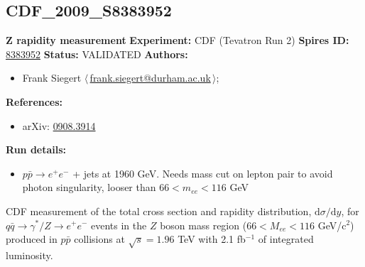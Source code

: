 \subsection[CDF\_2009\_S8383952]{CDF\_2009\_S8383952\,\cite{Aaltonen:2009pc}}
\textbf{Z rapidity measurement}\newline
\textbf{Experiment:} CDF (Tevatron Run 2) \newline
\textbf{Spires ID:} \href{http://www.slac.stanford.edu/spires/find/hep/www?rawcmd=key+8383952}{8383952}\newline
\textbf{Status:} VALIDATED\newline
\textbf{Authors:}
\begin{itemize}
  \item Frank Siegert $\langle\,$\href{mailto:frank.siegert@durham.ac.uk}{frank.siegert@durham.ac.uk}$\,\rangle$;
\end{itemize}
\textbf{References:}
\begin{itemize}
  \item arXiv: \href{http://arxiv.org/abs/0908.3914}{0908.3914}
\end{itemize}
\textbf{Run details:}
\begin{itemize}

  \item $p \bar{p} \to e^+ e^-$ + jets at 1960 GeV. Needs mass cut on lepton pair to  avoid photon singularity, looser than $66 < m_{ee} < 116$ GeV\end{itemize}

\noindent CDF measurement of the total cross section and rapidity distribution, $\mathrm{d}\sigma/\mathrm{d}y$, for $q\bar{q}\to \gamma^{*}/Z\to e^{+}e^{-}$ events in the $Z$ boson mass region ($66<M_{ee}<116$ GeV/c$^2$) produced in $p\bar{p}$ collisions at $\sqrt{s}=1.96$ TeV with 2.1 fb$^{-1}$ of integrated luminosity.

\clearpage


\clearpage

